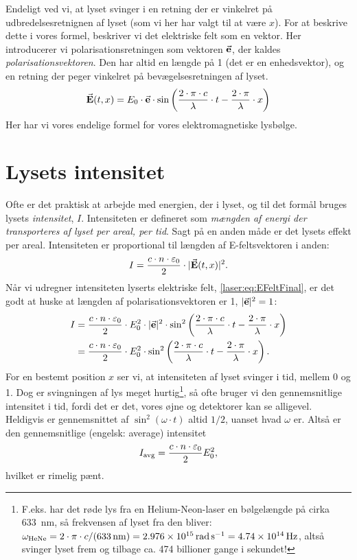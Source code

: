\documentclass[crop=false, class=memoir]{standalone}
\begin{document}
%
Endeligt ved vi, at lyset svinger i en retning der er vinkelret på udbredelsesretnignen af lyset (som vi her har valgt til at være $x$). For at beskrive dette i vores formel, beskriver vi det elektriske felt som en vektor. Her introducerer vi polarisationsretningen som vektoren $\va{e}$, der kaldes \emph{polarisationsvektoren}. Den har altid en længde på 1 (det er en enhedsvektor), og en retning der peger vinkelret på bevægelsesretningen af lyset.
%
\begin{align}\label{laser:eq:EFeltFinal}
    \va{E}(t, x) = E_0 \cdot \va{e} \cdot \sin\left(\frac{2\cdot\pi\cdot c}{\lambda} \cdot t - \frac{2\cdot\pi}{\lambda} \cdot x\right)
\end{align}
%
Her har vi vores endelige formel for vores elektromagnetiske lysbølge. 

\section{Lysets intensitet} \label{laser:sec:intensitet}
%
Ofte er det praktisk at arbejde med energien, der i lyset, og til det formål bruges lysets \emph{intensitet}, $I$. Intensiteten er defineret som \emph{mængden af energi der transporteres af lyset per areal, per tid}. Sagt på en anden måde er det lysets effekt per areal. Intensiteten er proportional til længden af E-feltsvektoren i anden:
%
\begin{align}
    I = \frac{c\cdot n \cdot \epsilon_0}{2} \cdot | \va{E}(t, x) |^2.
\end{align}
%
Når vi udregner intensiteten lyserts elektriske felt, \cref{laser:eq:EFeltFinal}, er det godt at huske at længden af polarisationsvektoren er 1, $|\va{e}|^2 = 1$:
%
\begin{align}
    I &= \frac{c \cdot n \cdot \epsilon_0}{2} \cdot E_0^2 \cdot |\va{e}|^2 \cdot \sin^2 \left(\frac{2\cdot\pi\cdot c}{\lambda} \cdot t - \frac{2\cdot\pi}{\lambda} \cdot x\right) \\
    &= \frac{c \cdot n \cdot \epsilon_0}{2} \cdot E_0^2 \cdot \sin^2 \left(\frac{2\cdot\pi\cdot c}{\lambda} \cdot t - \frac{2\cdot\pi}{\lambda} \cdot x\right).
\end{align}
%
For en bestemt position $x$ ser vi, at intensiteten af lyset svinger i tid, mellem 0 og 1. Dog er svingningen af lys meget hurtig\footnote{F.eks. har det røde lys fra en Helium-Neon-laser en bølgelængde på cirka \SI{633}{\nano\meter}, så frekvensen af lyset fra den bliver: $\omega_\textup{HeNe} = 2\cdot \pi \cdot c/(\SI{633}{\nano\meter}) = \SI{2.976e15}{\radian\per\second} = \SI{4.74e14}{\hertz}$, altså svinger lyset frem og tilbage ca. 474 billioner gange i sekundet!}, så ofte bruger vi den gennemsnitlige intensitet i tid, fordi det er det, vores øjne og detektorer kan se alligevel.  Heldigvis er gennemsnittet af $\sin^2(\omega\cdot t)$ altid $1/2$, uanset hvad $\omega$ er. Altså er den gennemsnitlige (engelsk: average) intensitet
%
\begin{align}
    I_\textup{avg} = \frac{c\cdot n \cdot \epsilon_0}{2} E_0^2,
\end{align}
%
hvilket er rimelig pænt. 
\end{document}
